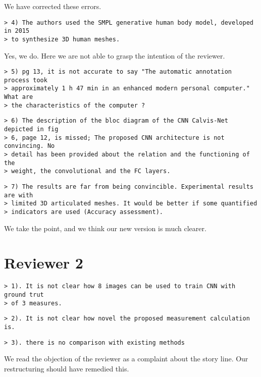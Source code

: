 \documentclass{article}
\begin{document}
 We have corrected these errors.

\begin{verbatim}
> 4) The authors used the SMPL generative human body model, developed in 2015
> to synthesize 3D human meshes.
\end{verbatim}

Yes, we do. Here we are not able to grasp the intention of the 
reviewer.

\begin{verbatim}
> 5) pg 13, it is not accurate to say "The automatic annotation process took
> approximately 1 h 47 min in an enhanced modern personal computer." What are
> the characteristics of the computer ?
\end{verbatim}

\begin{verbatim}
> 6) The description of the bloc diagram of the CNN Calvis-Net depicted in fig
> 6, page 12, is missed; The proposed CNN architecture is not convincing. No
> detail has been provided about the relation and the functioning of the
> weight, the convolutional and the FC layers.
\end{verbatim}

\begin{verbatim}
> 7) The results are far from being convincible. Experimental results are with
> limited 3D articulated meshes. It would be better if some quantified
> indicators are used (Accuracy assessment).
\end{verbatim} 

We take the point, and we think our new version is much clearer.

\section*{Reviewer 2}
\begin{verbatim}
> 1). It is not clear how 8 images can be used to train CNN with ground trut
> of 3 measures.
\end{verbatim}
\begin{verbatim}
> 2). It is not clear how novel the proposed measurement calculation is.
\end{verbatim}
\begin{verbatim}
> 3). there is no comparison with existing methods
\end{verbatim}

We read the objection of the reviewer as a complaint about the
story line. Our restructuring should have remedied this.
\end{document}
